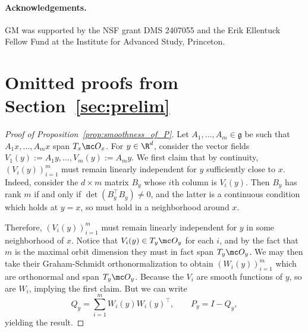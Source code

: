 \documentclass[twoside,a4paper,11pt]{article}
\theoremstyle{plain}
\begin{document}
\paragraph*{Acknowledgements.}
GM was supported by the NSF grant DMS 2407055 and the Erik Ellentuck Fellow Fund at the Institute for Advanced Study, Princeton. 


\appendix 
\section{Omitted proofs from Section~\ref{sec:prelim}}
\label{appendix:prelim_proofs}


\begin{proof}[Proof of Proposition~\ref{prop:smoothness_of_P}] Let $A_1, \ldots, A_m \in \mathfrak{g}$
be such that $A_1 x, \ldots, A_m x$
span $T_x\mc O_x$. For $y \in \R^d$, consider
the vector fields $V_1(y) := A_1  y,\ldots,  V_m(y) :=
A_m y.$ 
We first claim that by continuity,
$(V_i(y))_{i = 1}^m$ must 
remain linearly independent for $y$ sufficiently
close to $x$. Indeed, consider the $d \times m$ 
matrix $B_{y}$ whose $i$th column is $V_i(y)$.
Then $B_{y}$ has rank $m$ if and only
if $\det(B_{y}^\top B_{y}) \neq 0$, and the latter is a continuous
condition which holds at $y = x$, so must hold in a neighborhood
around $x$.

Therefore, $(V_i(y))_{i = 1}^m$ must 
remain linearly independent for $y$ in some neighborhood
of $x$. Notice that $V_i(y) \in T_y\mc O_y$
for each $i$, and by the fact that $m$ is the maximal orbit
dimension they must in fact span $T_y \mc O_y$.
We may then take their Graham-Schmidt orthonormalization to obtain
$(W_i(y))_{i= 1}^m$ which are orthonormal and 
span $T_y \mc O_y$. Because the $V_i$ are smooth functions of $y$, so are $W_i$,
implying the first claim.
But we can write
$$
Q_y = \sum_{i =1}^m W_i(y)W_i(y)^\top, \quad \quad 
P_y = I - Q_y,
$$ yielding the result.
\end{proof}
\end{document}
